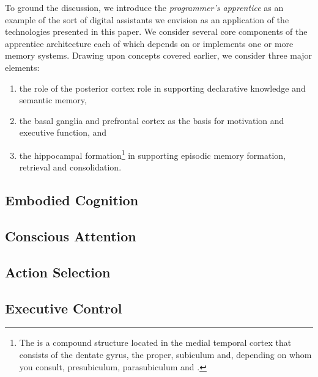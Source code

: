 To ground the discussion, we introduce the {\it{programmer's apprentice}} as an example of the sort of digital assistants we envision as an application of the technologies presented in this paper. We consider several core components of the apprentice architecture each of which depends on or implements one or more memory systems. Drawing upon concepts covered earlier, we consider three major elements:
%
\begin{enumerate}
%
\item the role of the posterior cortex role in supporting declarative knowledge and semantic memory,
%
\item the basal ganglia and prefrontal cortex as the basis for motivation and executive function, and
%
\item the hippocampal formation\footnote{%
%
  The {} is a compound structure located in the medial temporal cortex that consists of the dentate gyrus, the {} proper, subiculum and, depending on whom you consult, presubiculum, parasubiculum and {}.} 
%
in supporting episodic memory formation, retrieval and consolidation.
%
\end{enumerate}


\subsection{Embodied Cognition}
\label{subsection_embodied_cognition}


\subsection{Conscious Attention}
\label{subsection_conscious_attention}


\subsection{Action Selection}
\label{subsection_action_selection}


\subsection{Executive Control}
\label{subsection_executive_control}


